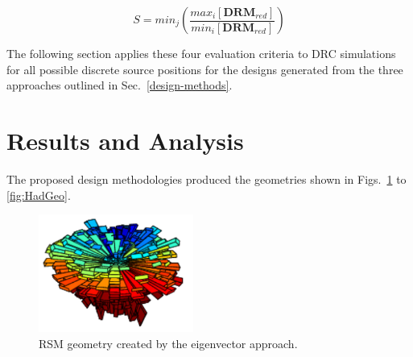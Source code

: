 \documentclass[3p,times]{elsarticle}
\begin{document}
\begin{equation}
S=min_{j}\left(\frac{max_{i} \left[\mathbf{DRM}_{red}\right]}{min_{i} \left[\mathbf{DRM}_{red}\right]}\right)
\label{eq:sens}
\end{equation}

The following section applies these four evaluation criteria to DRC simulations for all possible discrete source positions for the designs generated from the three approaches outlined in Sec.~\ref{design-methods}.

\section{Results and Analysis}
The proposed design methodologies produced the geometries shown in Figs.~\ref{fig:EVGeo} to \ref{fig:HadGeo}.

\begin{figure}[ht!]
\centering
\includegraphics[width={2.0in}]{../figs/EVGeo.pdf}
\caption{RSM geometry created by the eigenvector approach.}
\label{fig:EVGeo}
\end{figure}
\end{document}
